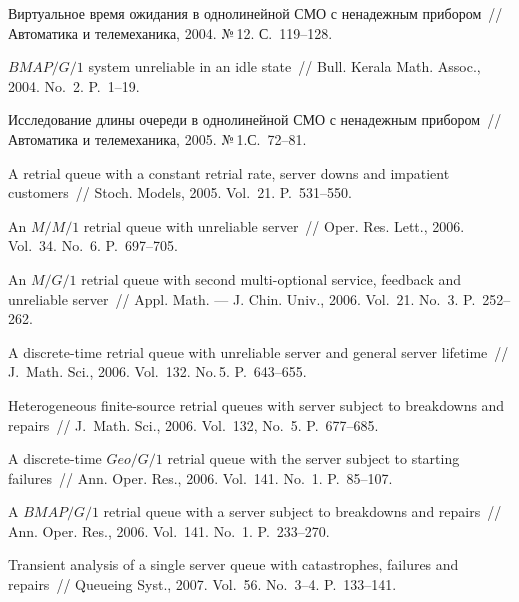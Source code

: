 \begin{multicols}{2}
{{\begin{thebibliography}{99}
Виртуальное время ожидания в однолинейной СМО с ненадежным прибором~//
Автоматика и телемеханика, 2004. №\,12. С.~119--128.

$BM\!AP/G/1$ system unreliable in an idle state~//
Bull. Kerala Math. Assoc., 2004. No.~2. P.~1--19.

Исследование длины очереди в однолинейной СМО с ненадежным прибором~//
Автоматика и телемеханика, 2005. №\,1.\linebreak С.~72--81.

A retrial queue with a constant retrial rate, server downs and impatient customers~//
Stoch. Models, 2005. Vol.~21. P.~531--550.

An $M/M/1$ retrial queue with unreliable server~//
Oper. Res. Lett., 2006. Vol.~34. No.~6. P.~697--705.

An $M/G/1$ retrial queue with second multi-optional service, feedback and unreliable server~//
Appl. Math. --- J. Chin. Univ., 2006. Vol.~21. No.~3. P.~252--262.

A discrete-time retrial queue with unreliable server and general server lifetime~// J.\ 
Math. Sci., 2006. Vol.~132. No.\,5. P.~643--655.


Heterogeneous finite-source retrial queues with server subject to breakdowns and repairs~//
J.\ Math. Sci., 2006. Vol.~132, No.~5. P.~677--685.

A discrete-time $Geo/G/1$ retrial queue with the server subject to starting failures~//
Ann. Oper. Res., 2006. Vol.~141. No.~1. P.~85--107.

A $BM\!AP/G/1$ retrial queue with a server subject to breakdowns and repairs~//
Ann. Oper. Res., 2006. Vol.~141. No.~1. P.~233--270.

Transient analysis of a single server queue with catastrophes, failures and repairs~//
Queueing Syst., 2007. Vol.~56. No.~3--4. P.~133--141.


\end{thebibliography}}}
\end{multicols}
